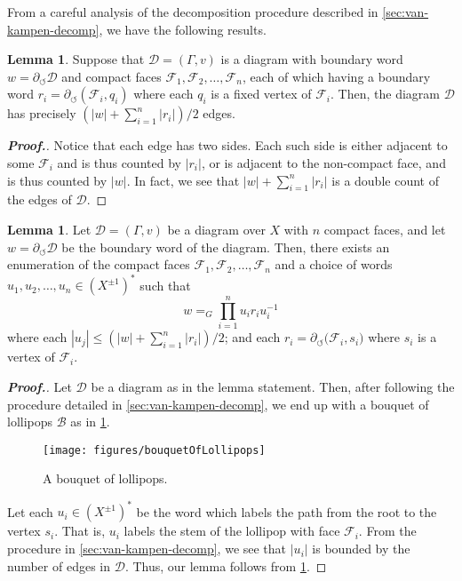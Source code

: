 \documentclass[11pt,a4paper,reqno]{amsart}
\theoremstyle{plain}
\theoremstyle{definition}
\newtheorem{lemma}[theorem]{Lemma}
\theoremstyle{definition}
\renewcommand\leq\leqslant
\newenvironment{myproof}{\begin{proof}[\normalfont\bfseries Proof.]}{\end{proof}}
\begin{document}
From a careful analysis of the decomposition procedure described in \cref{sec:van-kampen-decomp}, we have the following results.

\begin{lemma}\label{lem:diagram-size}
  Suppose that $\mathcal D = (\Gamma,v)$ is a diagram with boundary word $w = \partial_\circlearrowleft \mathcal D$ and compact faces $\mathcal F_1, \mathcal F_2,\ldots,\mathcal F_n$, each of which having a boundary word $r_i = \partial_\circlearrowleft (\mathcal F_i, q_i)$ where each $q_i$ is a fixed vertex of $\mathcal F_i$.
  Then, the diagram $\mathcal D$ has precisely
  $
      \left(
        |w| + \sum_{i=1}^n |r_i|
      \right)/2
  $
  edges.
\end{lemma}

\begin{myproof}
Notice that each edge has two sides.
Each such side is either adjacent to some $\mathcal F_i$ and is thus counted by $|r_i|$, or is adjacent to the non-compact face, and is thus counted by $|w|$.
In fact, we see that $|w|+\sum_{i=1}^n |r_i|$ is a double count of the edges of $\mathcal D$.
\end{myproof}

\begin{lemma}\label{lem:diagram-decomp}
	Let $\mathcal D = (\Gamma, v)$ be a diagram over $X$ with $n$ compact faces, and let $w = \partial_\circlearrowleft \mathcal D$ be the boundary word of the diagram.
  Then, there exists an enumeration of the compact faces $\mathcal F_1, \mathcal F_2,\ldots, \mathcal F_n$ and a choice of words $u_1,u_2,\ldots,u_n\in (X^{\pm 1})^*$ such that
	\[
		w
		=_{G}
		\prod_{i=1}^{n}
    u_i r_i u_{i}^{-1}
	\]
  where
     each $|u_j|\leq (|w|+\sum_{i=1}^n |r_i|)/2$;
     and each $r_i  = \partial_{\circlearrowleft} \mathcal (\mathcal F_i,s_i)$ where $s_i$ is a vertex of $\mathcal F_i$.
\end{lemma}

\begin{myproof}
Let $\mathcal D$ be a diagram as in the lemma statement.
Then, after following the procedure detailed in \cref{sec:van-kampen-decomp}, we end up with a bouquet of lollipops $\mathcal B$ as in \cref{fig:bouquet-of-lollipops}.

\begin{figure}[ht!]
	\centering
  \texttt{[image: figures/bouquetOfLollipops]}
	\caption{A bouquet of lollipops.}\label{fig:bouquet-of-lollipops}
\end{figure}

Let each $u_i\in (X^{\pm 1})^*$ be the word which labels the path from the root to the vertex $s_i$.
That is, $u_i$ labels the stem of the lollipop with face $\mathcal F_i$.
From the procedure in \cref{sec:van-kampen-decomp}, we see that $|u_i|$ is bounded by the number of edges in $\mathcal D$.
Thus, our lemma follows from \cref{lem:diagram-size}.
\end{myproof}
\end{document}
